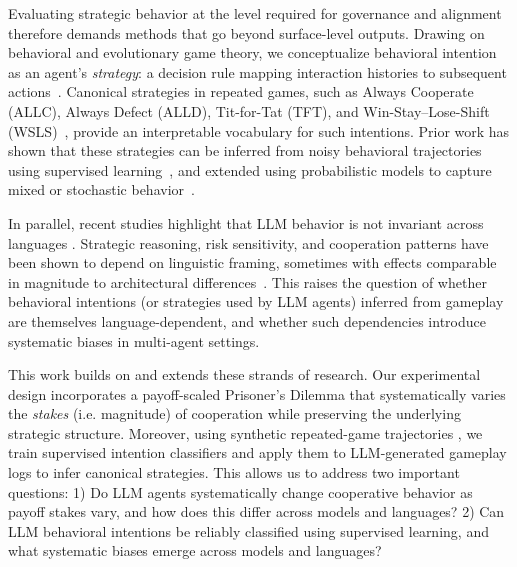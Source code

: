 \documentclass{article}
\begin{document}
Evaluating strategic behavior at the level required for governance and alignment therefore demands methods that go beyond surface-level outputs. Drawing on behavioral and evolutionary game theory, we conceptualize behavioral intention as an agent’s \emph{strategy}: a decision rule mapping interaction histories to subsequent actions~\cite{han2011role,diStefanoIntention2023,Han2012ALIFEjournal,fujimoto2019functional}. Canonical strategies in repeated games, such as Always Cooperate (ALLC), Always Defect (ALLD), Tit-for-Tat (TFT), and Win-Stay–Lose-Shift (WSLS)~\cite{Axelrod1980Effective,sigmund:2010bo}, provide an interpretable vocabulary for such intentions. Prior work has shown that these strategies can be inferred from noisy behavioral trajectories using supervised learning~\cite{han2011role,diStefanoIntention2023}, and extended using probabilistic models to capture mixed or stochastic behavior~\cite{inferenceStrategies}.

In parallel, recent studies highlight that LLM behavior is not invariant across languages \cite{buscemi2025fairgame}. Strategic reasoning, risk sensitivity, and cooperation patterns have been shown to depend on linguistic framing, sometimes with effects comparable in magnitude to architectural differences~\cite{loreheydari2024strategic,buscemi2025llms}. This raises the question of whether behavioral intentions (or strategies used by LLM agents) inferred from gameplay are themselves language-dependent, and whether such dependencies introduce systematic biases in multi-agent settings.

This work builds on and extends these strands of research. Our experimental design incorporates a payoff-scaled Prisoner’s Dilemma that systematically  varies the \emph{stakes} (i.e. magnitude) of cooperation while preserving the underlying strategic structure. Moreover, using synthetic repeated-game trajectories \cite{han2011role}, we train supervised intention classifiers and apply them to LLM-generated gameplay logs to infer canonical strategies. This allows us to address two important questions:  
1) Do LLM agents systematically change cooperative behavior as payoff stakes vary, and how does this differ across models and languages?  
2) Can LLM behavioral intentions be reliably classified using supervised learning, and what systematic biases emerge across models and languages?
\end{document}
